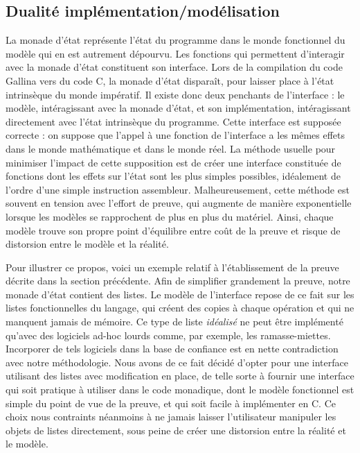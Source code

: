 		\subsection{Dualité implémentation/modélisation}
			La monade d'état représente l'état du programme dans le monde fonctionnel du modèle qui en est autrement dépourvu. Les fonctions qui permettent d'interagir avec la monade d'état constituent son interface. Lors de la compilation du code Gallina vers du code C, la monade d'état disparaît, pour laisser place à l'état intrinsèque du monde impératif.
			Il existe donc deux penchants de l'interface : le modèle, intéragissant avec la monade d'état, et son implémentation, intéragissant directement avec l'état intrinsèque du programme. Cette interface est supposée correcte : on suppose que l'appel à une fonction de l'interface a les mêmes effets dans le monde mathématique et dans le monde réel. La méthode usuelle pour minimiser l'impact de cette supposition est de créer une interface constituée de fonctions dont les effets sur l'état sont les plus simples possibles, idéalement de l'ordre d'une simple instruction assembleur.
			Malheureusement, cette méthode est souvent en tension avec l'effort de preuve, qui augmente de manière exponentielle lorsque les modèles se rapprochent de plus en plus du matériel. Ainsi, chaque modèle trouve son propre point d'équilibre entre coût de la preuve et risque de distorsion entre le modèle et la réalité.

			Pour illustrer ce propos, voici un exemple relatif à l'établissement de la preuve décrite dans la section précédente. Afin de simplifier grandement la preuve, notre monade d'état contient des listes. Le modèle de l'interface repose de ce fait sur les listes fonctionnelles du langage, qui créent des copies à chaque opération et qui ne manquent jamais de mémoire. Ce type de liste \emph{idéalisé} ne peut être implémenté qu'avec des logiciels ad-hoc lourds comme, par exemple, les ramasse-miettes. Incorporer de tels logiciels dans la base de confiance est en nette contradiction avec notre méthodologie.
			Nous avons de ce fait décidé d'opter pour une interface utilisant des listes avec modification en place, de telle sorte à fournir une interface qui soit pratique à utiliser dans le code monadique, dont le modèle fonctionnel est simple du point de vue de la preuve, et qui soit facile à implémenter en C. Ce choix nous contraints néanmoins à ne jamais laisser l'utilisateur manipuler les objets de listes directement, sous peine de créer une distorsion entre la réalité et le modèle.

